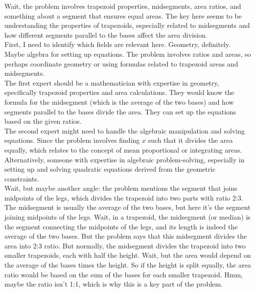 \begin{tcolorbox}[
  title=Multiagent Collaborative Reasoning Trace Data Sample,
  breakable,
  colback=white,
  colframe=black
]
Wait, the problem involves trapezoid properties, midsegments, area ratios, and something about a segment that ensures equal areas. The key here seems to be understanding the properties of trapezoids, especially related to midsegments and how different segments parallel to the bases affect the area division.\\[1ex]

First, I need to identify which fields are relevant here. Geometry, definitely. Maybe algebra for setting up equations. The problem involves ratios and areas, so perhaps coordinate geometry or using formulas related to trapezoid areas and midsegments.\\[1ex]

The first expert should be a mathematician with expertise in geometry, specifically trapezoid properties and area calculations. They would know the formula for the midsegment (which is the average of the two bases) and how segments parallel to the bases divide the area. They can set up the equations based on the given ratios.\\[1ex]

The second expert might need to handle the algebraic manipulation and solving equations. Since the problem involves finding \(x\) such that it divides the area equally, which relates to the concept of mean proportional or integrating areas. Alternatively, someone with expertise in algebraic problem-solving, especially in setting up and solving quadratic equations derived from the geometric constraints.\\[1ex]

Wait, but maybe another angle: the problem mentions the segment that joins midpoints of the legs, which divides the trapezoid into two parts with ratio 2:3. The midsegment is usually the average of the two bases, but here it's the segment joining midpoints of the legs. Wait, in a trapezoid, the midsegment (or median) is the segment connecting the midpoints of the legs, and its length is indeed the average of the two bases. But the problem says that this midsegment divides the area into 2:3 ratio. But normally, the midsegment divides the trapezoid into two smaller trapezoids, each with half the height. Wait, but the area would depend on the average of the bases times the height. So if the height is split equally, the area ratio would be based on the sum of the bases for each smaller trapezoid. Hmm, maybe the ratio isn't 1:1, which is why this is a key part of the problem.\\[1ex]


\end{tcolorbox}
